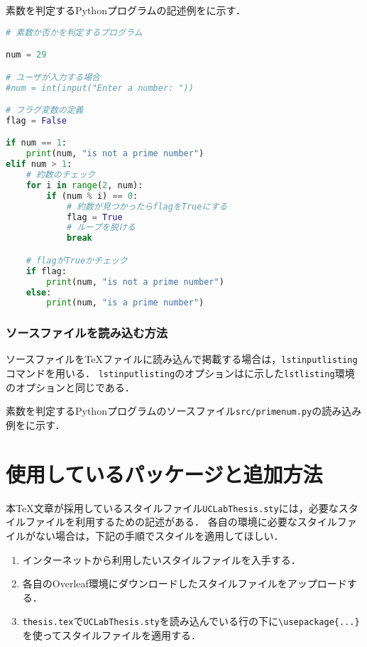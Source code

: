 素数を判定するPythonプログラムの記述例をに示す．

\begin{lstlisting}[language=Python,caption=素数判定プログラム（直接記述の場合）,label=src:PrimeNumDescription]
# 素数か否かを判定するプログラム

num = 29

# ユーザが入力する場合
#num = int(input("Enter a number: "))

# フラグ変数の定義
flag = False

if num == 1:
    print(num, "is not a prime number")
elif num > 1:
    # 約数のチェック
    for i in range(2, num):
        if (num % i) == 0:
            # 約数が見つかったらflagをTrueにする
            flag = True
            # ループを脱ける
            break

    # flagがTrueかチェック
    if flag:
        print(num, "is not a prime number")
    else:
        print(num, "is a prime number")
\end{lstlisting}


\subsection{ソースファイルを読み込む方法}
\label{subsec:lstinputlisting}

ソースファイルを{\TeX}ファイルに読み込んで掲載する場合は，\texttt{lstinputlisting}コマンドを用いる．
\texttt{lstinputlisting}のオプションはに示した\texttt{lstlisting}環境のオプションと同じである．

\begin{code}

\end{code}%

素数を判定するPythonプログラムのソースファイル\texttt{src/primenum.py}の読み込み例をに示す．





\chapter{使用しているパッケージと追加方法}\label{apdx:package}

本{\TeX}文章が採用しているスタイルファイル\texttt{UCLabThesis.sty}には，必要なスタイルファイルを利用するための記述がある．
各自の環境に必要なスタイルファイルがない場合は，下記の手順でスタイルを適用してほしい．
\begin{enumerate}
    \item インターネットから利用したいスタイルファイルを入手する．
    \item 各自のOverleaf環境にダウンロードしたスタイルファイルをアップロードする．
    \item \texttt{thesis.tex}で\texttt{UCLabThesis.sty}を読み込んでいる行の下に\verb|\usepackage{...}|を使ってスタイルファイルを適用する．
\end{enumerate}

\endinput